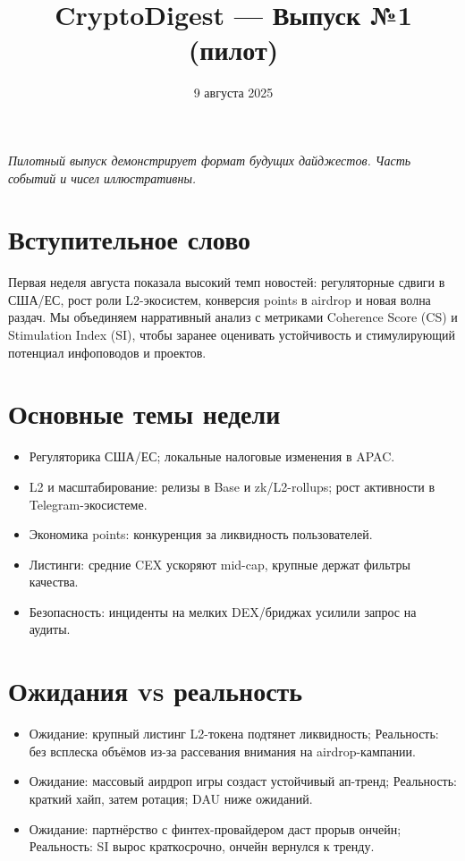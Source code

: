 \documentclass[12pt,a4paper]{article}
\title{CryptoDigest --- Выпуск №1 (пилот)}
\date{9 августа 2025}
\begin{document}
\maketitle
\noindent\textit{Пилотный выпуск демонстрирует формат будущих дайджестов. Часть событий и чисел иллюстративны.}

\section*{Вступительное слово}
Первая неделя августа показала высокий темп новостей: регуляторные сдвиги в США/ЕС, рост роли L2-экосистем, конверсия points в airdrop и новая волна раздач. Мы объединяем нарративный анализ с метриками Coherence Score (CS) и Stimulation Index (SI), чтобы заранее оценивать устойчивость и стимулирующий потенциал инфоповодов и проектов.

\section*{Основные темы недели}
\begin{itemize}
  \item Регуляторика США/ЕС; локальные налоговые изменения в APAC.
  \item L2 и масштабирование: релизы в Base и zk/L2-rollups; рост активности в Telegram-экосистеме.
  \item Экономика points: конкуренция за ликвидность пользователей.
  \item Листинги: средние CEX ускоряют mid-cap, крупные держат фильтры качества.
  \item Безопасность: инциденты на мелких DEX/бриджах усилили запрос на аудиты.
\end{itemize}

\section*{Ожидания vs реальность}
\begin{itemize}
  \item Ожидание: крупный листинг L2-токена подтянет ликвидность; Реальность: без всплеска объёмов из-за рассевания внимания на airdrop-кампании.
  \item Ожидание: массовый аирдроп игры создаст устойчивый ап-тренд; Реальность: краткий хайп, затем ротация; DAU ниже ожиданий.
  \item Ожидание: партнёрство с финтех-провайдером даст прорыв ончейн; Реальность: SI вырос краткосрочно, ончейн вернулся к тренду.
\end{itemize}
\end{document}
